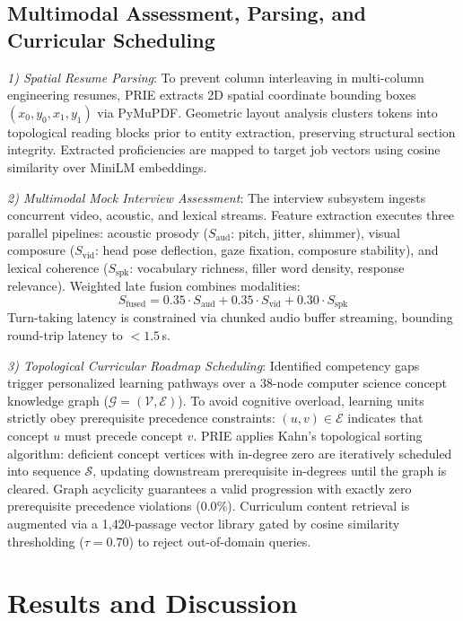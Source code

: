 \documentclass[conference]{IEEEtran}
\begin{document}
\subsection{Multimodal Assessment, Parsing, and Curricular Scheduling}
\textit{1) Spatial Resume Parsing}: To prevent column interleaving in multi-column engineering resumes, PRIE extracts 2D spatial coordinate bounding boxes $(x_0, y_0, x_1, y_1)$ via PyMuPDF. Geometric layout analysis clusters tokens into topological reading blocks prior to entity extraction, preserving structural section integrity. Extracted proficiencies are mapped to target job vectors using cosine similarity over MiniLM embeddings.

\textit{2) Multimodal Mock Interview Assessment}: The interview subsystem ingests concurrent video, acoustic, and lexical streams. Feature extraction executes three parallel pipelines: acoustic prosody ($S_{\text{aud}}$: pitch, jitter, shimmer), visual composure ($S_{\text{vid}}$: head pose deflection, gaze fixation, composure stability), and lexical coherence ($S_{\text{spk}}$: vocabulary richness, filler word density, response relevance). Weighted late fusion combines modalities:
\begin{equation}
S_{\text{fused}} = 0.35 \cdot S_{\text{aud}} + 0.35 \cdot S_{\text{vid}} + 0.30 \cdot S_{\text{spk}}
\label{eq_fusion}
\end{equation}
Turn-taking latency is constrained via chunked audio buffer streaming, bounding round-trip latency to $<1.5$\,s.

\textit{3) Topological Curricular Roadmap Scheduling}: Identified competency gaps trigger personalized learning pathways over a 38-node computer science concept knowledge graph ($\mathcal{G} = (\mathcal{V}, \mathcal{E})$). To avoid cognitive overload, learning units strictly obey prerequisite precedence constraints: $(u, v) \in \mathcal{E}$ indicates that concept $u$ must precede concept $v$. PRIE applies Kahn's topological sorting algorithm: deficient concept vertices with in-degree zero are iteratively scheduled into sequence $\mathcal{S}$, updating downstream prerequisite in-degrees until the graph is cleared. Graph acyclicity guarantees a valid progression with exactly zero prerequisite precedence violations ($0.0\%$). Curriculum content retrieval is augmented via a 1,420-passage vector library gated by cosine similarity thresholding ($\tau = 0.70$) to reject out-of-domain queries.

\section{Results and Discussion}
\end{document}
